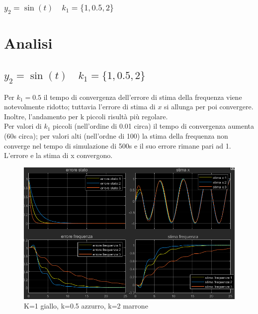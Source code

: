 \documentclass{beamer}
\begin{document}
\begin{frame}
    \frametitle{\(y_{2}=\sin(t)\quad k_{1}=\{1,0.5,2\}\)}
    \section{Analisi}
    \subsection{\(y_{2}=\sin(t)\quad k_{1}=\{1,0.5,2\}\)}
    \begin{minipage}[t]{0.5\textwidth}
        \small
        Per \(k_{1}=0.5\) il tempo di convergenza dell'errore di stima della frequenza viene notevolmente ridotto; tuttavia l'errore di stima di \(x\) si allunga per poi convergere. Inoltre, l'andamento per k piccoli risultà più regolare.\\
        Per valori di \(k_{1}\) piccoli (nell'ordine di 0.01 circa) il tempo di convergenza aumenta (\>60s circa); per valori alti (nell'ordne di 100) la stima della frequenza non converge nel tempo di simulazione di 500s e il suo errore rimane pari ad 1. L'errore e la stima di x convergono.
    \end{minipage}\hspace{0.5cm}
    \begin{minipage}[t]{0.4\textwidth}
        \begin{figure}
            \includegraphics[scale=0.25]{2022-05-15-18-06-51.png}%
            \caption{K=1 giallo, k=0.5 azzurro, k=2 marrone}
        \end{figure}
    \end{minipage}
\end{frame}
\end{document}
